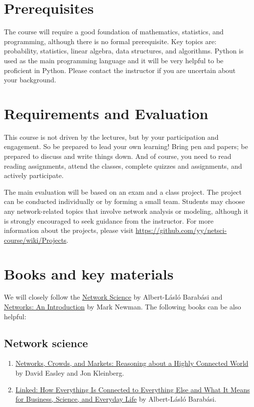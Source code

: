 \documentclass[11pt,article,oneside]{memoir} %
\begin{document}
\section{Prerequisites} %

The course will require a good foundation of mathematics, statistics, and programming,
although there is no formal prerequisite. Key topics are:
probability, statistics, linear algebra, data structures, and algorithms.
Python is used as the main programming language and it will be very helpful to
be proficient in Python. Please contact the instructor if you are uncertain
about your background.

\section{Requirements and Evaluation} %

This course is not driven by the lectures, but by your participation and engagement.
So be prepared to lead your own learning! 
Bring pen and papers; be prepared to discuss and write things down.
And of course, you need to read reading assignments, attend the classes, complete quizzes and assignments, and actively participate.

The main evaluation will be based on an exam and a class project.
The project can be conducted individually or by forming a small team.
Students may choose any network-related topics that involve network analysis or modeling, although it is strongly encouraged to seek guidance from the instructor.
For more information about the projects, please visit \url{https://github.com/yy/netsci-course/wiki/Projects}.

\section{Books and key materials} %

We will closely follow the
\href{http://barabasi.com/networksciencebook/}{Network Science} by Albert-Lásló
Barabási and
\href{https://www.amazon.com/Networks-Mark-Newman/dp/0198805098}{Networks:
An Introduction} by Mark Newman. The following books can be also helpful:

\subsection{Network science} %

\begin{enumerate}
    \item \href{https://www.amazon.com/Networks-Crowds-Markets-Reasoning-Connected/dp/0521195330}{Networks, Crowds, and Markets: Reasoning about a Highly Connected World} by David Easley and Jon Kleinberg.
    \item \href{https://www.amazon.com/Linked-Everything-Connected-Business-Everyday/dp/0465085733}{Linked: How Everything Is Connected to Everything Else and What It Means for Business, Science, and Everyday Life} by Albert-Lásló Barabási.
\end{enumerate}
\end{document}
